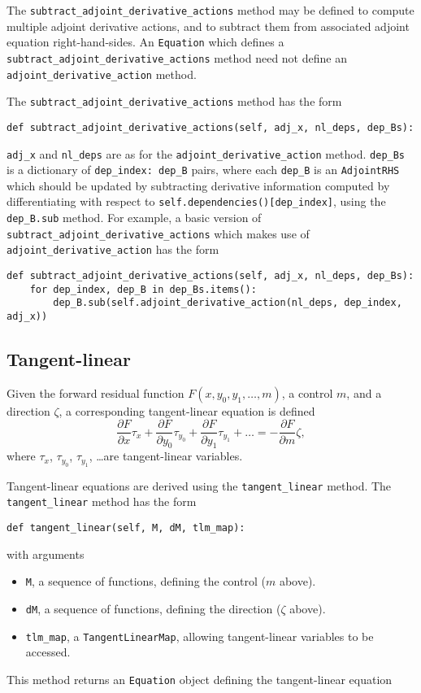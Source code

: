 \documentclass[11pt]{article}
\begin{document}
The \texttt{subtract\_adjoint\_derivative\_actions} method may be defined to
compute multiple adjoint derivative actions, and to subtract them from
associated adjoint equation right-hand-sides. An \texttt{Equation} which
defines a \texttt{subtract\_adjoint\_derivative\_actions} method need not
define an \texttt{adjoint\_derivative\_action} method.

The \texttt{subtract\_adjoint\_derivative\_actions} method has the form
\begin{lstlisting}
def subtract_adjoint_derivative_actions(self, adj_x, nl_deps, dep_Bs):
\end{lstlisting}
\texttt{adj\_x} and \texttt{nl\_deps} are as for the
\texttt{adjoint\_derivative\_action} method. \texttt{dep\_Bs} is a dictionary
of \texttt{dep\_index: dep\_B} pairs, where each \texttt{dep\_B} is an
\texttt{AdjointRHS} which should be updated by subtracting derivative
information computed by differentiating with respect to
\texttt{self.dependencies()[dep\_index]}, using the \texttt{dep\_B.sub} method.
For example, a basic version of \texttt{subtract\_adjoint\_derivative\_actions}
which makes use of \texttt{adjoint\_derivative\_action} has the form
\begin{lstlisting}
def subtract_adjoint_derivative_actions(self, adj_x, nl_deps, dep_Bs):
    for dep_index, dep_B in dep_Bs.items():
        dep_B.sub(self.adjoint_derivative_action(nl_deps, dep_index, adj_x))
\end{lstlisting}

\subsection{Tangent-linear}\label{sect:tangent_linear}

Given the forward residual function $F \left( x, y_0, y_1, \ldots, m \right)$,
a control $m$, and a direction $\zeta$, a corresponding tangent-linear equation
is defined
\begin{equation*}
  \frac{\partial F}{\partial x} \tau_x
    + \frac{\partial F}{\partial y_0} \tau_{y_0}
    + \frac{\partial F}{\partial y_1} \tau_{y_1}
    + \ldots = -\frac{\partial F}{\partial m} \zeta,
\end{equation*}
where $\tau_x$, $\tau_{y_0}$, $\tau_{y_1}$, \ldots are tangent-linear
variables.

Tangent-linear equations are derived using the \texttt{tangent\_linear} method.
The \texttt{tangent\_linear} method has the form
\begin{lstlisting}
def tangent_linear(self, M, dM, tlm_map):
\end{lstlisting}
with arguments
\begin{itemize}
  \item \texttt{M}, a sequence of functions, defining the control ($m$ above).
  \item \texttt{dM}, a sequence of functions, defining the direction ($\zeta$
    above).
  \item \texttt{tlm\_map}, a \texttt{TangentLinearMap}, allowing tangent-linear
    variables to be accessed.
\end{itemize}
This method returns an \texttt{Equation} object defining the tangent-linear
equation
\end{document}
